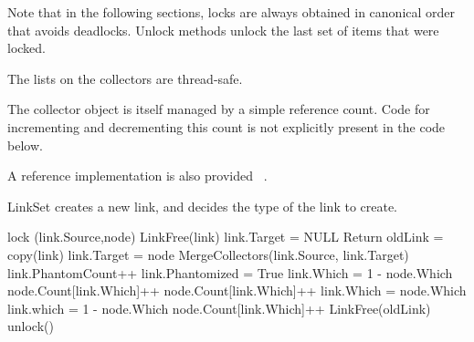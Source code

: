Note that in the following sections, locks are always obtained in canonical order that avoids deadlocks. Unlock methods unlock the last set of items that were locked.

The lists on the collectors are thread-safe.

The collector object is itself managed by a simple reference count. Code for incrementing and decrementing this count is not explicitly present in the code below.

A reference implementation is also provided ~\cite{url:refimpl}.

\begin{algorithm}[H]
		\scriptsize
			\caption{LinkSet creates a new link,
				and decides the type of the link to create.}
			\label{single:algorithm:linkset}
			
				\begin{multicols}{2}
					\begin{algorithmic}[1]
		
\State lock (link.Source,node)
\State LinkFree(link)
\State link.Target = NULL
\EndIf
{}
\State Return
\EndIf
\State oldLink = copy(link) 
\State link.Target = node
\State MergeCollectors(link.Source, link.Target)
\State link.PhantomCount++
\State link.Phantomized = True
\State link.Which = 1 - node.Which
\State node.Count[link.Which]++
\State node.Count[link.Which]++
\State link.Which = node.Which
\Else
\State link.which = 1 - node.Which
\State node.Count[link.Which]++
\EndIf
{}
\State LinkFree(oldLink)
\EndIf
\State unlock()
\EndProcedure
\end{algorithmic}
\end{multicols}
\end{algorithm}
\setlength{\textfloatsep}{0pt}

